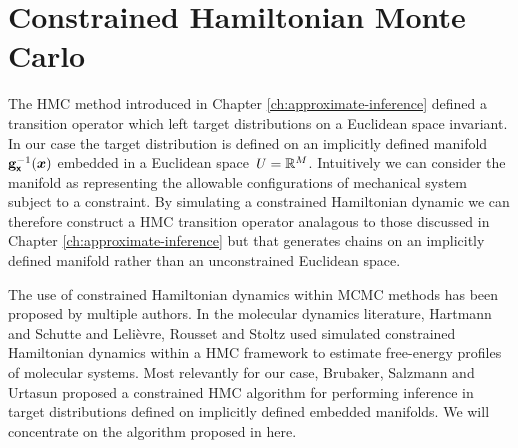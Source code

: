 \section{Constrained Hamiltonian Monte Carlo}\label{sec:chmc}

The \ac{HMC} method introduced in Chapter \ref{ch:approximate-inference} defined a transition operator which left target distributions on a Euclidean space invariant. In our case the target distribution is defined on an implicitly defined manifold ${\mathbf{g}}_{\boldsymbol{\mathsf{x}}}^{-1}(\boldsymbol{x})$ embedded in a Euclidean space $\mathit{U}=\mathbb{R}^M$. Intuitively we can consider the manifold as representing the allowable configurations of mechanical system subject to a constraint. By simulating a constrained Hamiltonian dynamic we can therefore construct a \ac{HMC} transition operator analagous to those discussed in Chapter \ref{ch:approximate-inference} but that generates chains on an implicitly defined manifold rather than an unconstrained Euclidean space.

The use of constrained Hamiltonian dynamics within \ac{MCMC} methods has been proposed by multiple authors. In the molecular dynamics literature, Hartmann and Schutte \citep{hartmann2005constrained} and Leli{\`e}vre, Rousset and Stoltz \citep{lelievre2012langevin} used simulated constrained Hamiltonian dynamics within a \ac{HMC} framework to estimate free-energy profiles of molecular systems. Most relevantly for our case, Brubaker, Salzmann and Urtasun \citep{brubaker2012family} proposed a constrained \ac{HMC} algorithm for performing inference in target distributions defined on implicitly defined embedded manifolds. We will concentrate on the algorithm proposed in \citep{brubaker2012family} here. %

